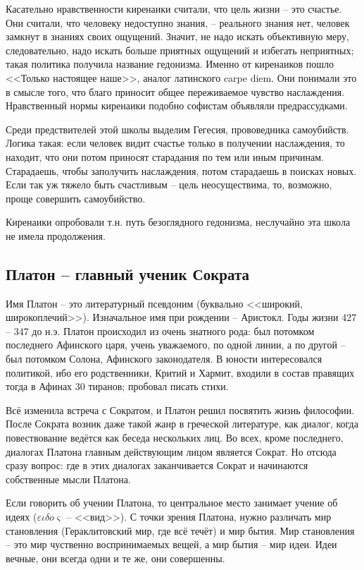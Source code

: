 \documentclass[a4paper, 12pt]{book} %
\begin{document}
Касательно нравственности киренаики считали, что цель жизни -- это счастье. Они считали, что человеку недоступно знания, -- реального знания нет, человек замкнут в знаниях своих ощущений. Значит, не надо искать объективную меру, следовательно, надо искать больше приятных ощущений и избегать неприятных; такая политика получила название гедонизма. Именно от киренаиков пошло <<Только настоящее наше>>, аналог латинского carpe diem. Они понимали это в смысле того, что благо приносит общее переживаемое чувство наслаждения. Нравственный нормы киренаики подобно софистам объявляли предрассудками.

Среди предствителей этой школы выделим Гегесия, прововедника самоубийств. Логика такая: если человек видит счастье только в получении наслаждения, то находит, что они потом приносят старадания по тем или иным причинам. Старадаешь, чтобы заполучить наслаждения, потом старадаешь в поисках новых. Если так уж тяжело быть счастливым -- цель неосуществима, то, возможно, проще совершить самоубийство.

Киренаики опробовали т.н. путь безоглядного гедонизма, неслучайно эта школа не имела продолжения.

\subsection{Платон -- главный ученик Сократа}

Имя Платон -- это литературный псевдоним (буквально <<широкий, широкоплечий>>). Изначальное имя при рождении -- Аристокл. Годы жизни 427 -- 347 до н.э. Платон происходил из очень знатного рода: был потомком последнего Афинского царя, учень уважаемого, по одной линии, а по другой -- был потомком Солона, Афинского законодателя. В юности интересовался политикой, ибо его родственники, Критий и Хармит, входили в состав правящих тогда в Афинах 30 тиранов; пробовал писать стихи.

Всё изменила встреча с Сократом, и Платон решил посвятить жизнь философии. После Сократа возник даже такой жанр в греческой литературе, как диалог, когда повествование ведётся как беседа нескольких лиц. Во всех, кроме последнего, диалогах Платона главным действующим лицом является Сократ. Но отсюда сразу вопрос: где в этих диалогах заканчивается Сократ и начинаются собственные мысли Платона. 

Если говорить об учении Платона, то центральное место занимает учение об идеях ($\varepsilon \iota \delta o \varsigma$  -- <<вид>>). С точки зрения Платона, нужно различать мир становления (Гераклитовский мир, где всё течёт) и мир бытия. Мир становления -- это мир чуственно воспринимаемых вещей, а мир бытия -- мир идеи. Идеи вечные, они всегда одни и те же, они совершенны. 
\end{document}
